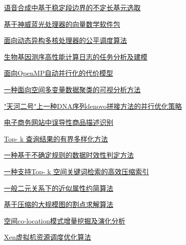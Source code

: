 \documentclass[a4paper]{article}
\begin{document}
\href{http://www.jos.org.cn/ch/reader/download_pdf.aspx?file_no=14024&year_id=2014&quarter_id=S2&falg=1}{语音合成中基于稳定段边界的不定长基元选取}

\href{http://www.jos.org.cn/ch/reader/download_pdf.aspx?file_no=14025&year_id=2014&quarter_id=S2&falg=1}{基于神威蓝光处理器的向量数学软件包}

\href{http://www.jos.org.cn/ch/reader/download_pdf.aspx?file_no=14026&year_id=2014&quarter_id=S2&falg=1}{面向动态异构多核处理器的公平调度算法}

\href{http://www.jos.org.cn/ch/reader/download_pdf.aspx?file_no=14027&year_id=2014&quarter_id=S2&falg=1}{生物基因测序高性能计算日志的任务分析及建模}

\href{http://www.jos.org.cn/ch/reader/download_pdf.aspx?file_no=14028&year_id=2014&quarter_id=S2&falg=1}{面向OpenMP自动并行化的代价模型}

\href{http://www.jos.org.cn/ch/reader/download_pdf.aspx?file_no=14029&year_id=2014&quarter_id=S2&falg=1}{一种面向空间多变量数据聚类的可视分析方法}

\href{http://www.jos.org.cn/ch/reader/download_pdf.aspx?file_no=14030&year_id=2014&quarter_id=S2&falg=1}{"天河二号"上一种DNA序列denovo拼接方法的并行优化策略}

\href{http://www.jos.org.cn/ch/reader/download_pdf.aspx?file_no=14031&year_id=2014&quarter_id=S2&falg=1}{电子商务网站中误导性商品描述识别}

\href{http://www.jos.org.cn/ch/reader/download_pdf.aspx?file_no=14032&year_id=2014&quarter_id=S2&falg=1}{Top- k 查询结果的有界多样化方法}

\href{http://www.jos.org.cn/ch/reader/download_pdf.aspx?file_no=14033&year_id=2014&quarter_id=S2&falg=1}{一种基于不确定规则的数据时效性判定方法}

\href{http://www.jos.org.cn/ch/reader/download_pdf.aspx?file_no=14034&year_id=2014&quarter_id=S2&falg=1}{一种支持Top- k 空间关键词检索的高效压缩索引}

\href{http://www.jos.org.cn/ch/reader/download_pdf.aspx?file_no=14035&year_id=2014&quarter_id=S2&falg=1}{一般二元关系下的近似属性约简算法}

\href{http://www.jos.org.cn/ch/reader/download_pdf.aspx?file_no=14036&year_id=2014&quarter_id=S2&falg=1}{基于压缩的大规模图的割点求解算法}

\href{http://www.jos.org.cn/ch/reader/download_pdf.aspx?file_no=14037&year_id=2014&quarter_id=S2&falg=1}{空间co-location模式增量挖掘及演化分析}

\href{http://www.jos.org.cn/ch/reader/download_pdf.aspx?file_no=14038&year_id=2014&quarter_id=S2&falg=1}{Xen虚拟机资源调度优化算法}
\end{document}
